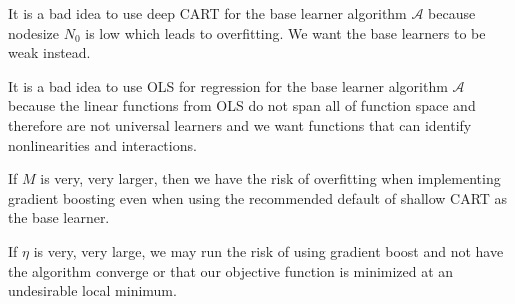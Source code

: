 \documentclass[12pt]{article}
\begin{document}
\begin{enumerate}
\begin{tcolorbox}[colback=white, sharp corners]
It is a bad idea to use deep CART for the base learner algorithm $\mathcal{A}$ because nodesize $N_0$ is low which leads to overfitting. We want the base learners to be weak instead. 
\end{tcolorbox}


\begin{tcolorbox}[colback=white, sharp corners]
It is a bad idea to use OLS for regression for the base learner algorithm $\mathcal{A}$ because the linear functions from OLS do not span all of function space and therefore are not universal learners and we want functions that can identify nonlinearities and interactions. 
\end{tcolorbox}


\begin{tcolorbox}[colback=white, sharp corners]
If $M$ is very, very larger, then we have the risk of overfitting when implementing gradient boosting even when using the recommended default of shallow CART as the base learner. 
\end{tcolorbox}


\begin{tcolorbox}[colback=white, sharp corners]
If $\eta$ is very, very large, we may run the risk of using gradient boost and not have the algorithm converge or that our objective function is minimized at an undesirable local minimum. 
\end{tcolorbox}

\end{enumerate}
\end{document}
